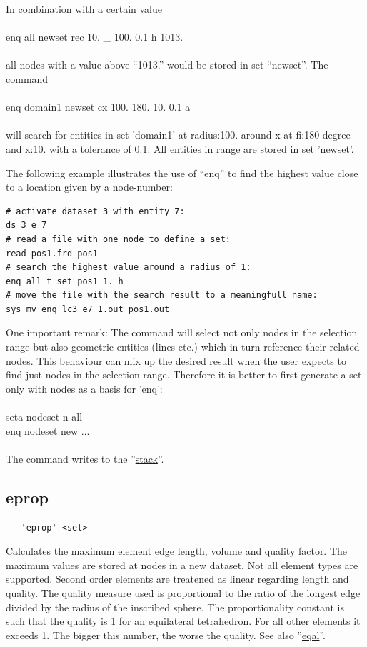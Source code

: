 \documentclass{article}
\providecommand{\htmlref}[2]{\hyperref[#2]{#1}}
\begin{document}
In combination with a certain value\\\\
enq all newset rec 10. \_ 100. 0.1 h 1013.\\\\all nodes with a value above ``1013.'' would be stored in set ``newset''. The command \\\\
enq domain1 newset cx 100. 180. 10. 0.1 a\\\\
will search for entities in set 'domain1' at radius:100. around x at fi:180 degree and x:10. with a tolerance of 0.1. All entities in range are stored in set 'newset'.

The following example illustrates the use of ``enq'' to find the highest value close to a location given by a node-number: 
\begin{verbatim}
# activate dataset 3 with entity 7:
ds 3 e 7
# read a file with one node to define a set:
read pos1.frd pos1
# search the highest value around a radius of 1:
enq all t set pos1 1. h
# move the file with the search result to a meaningfull name:
sys mv enq_lc3_e7_1.out pos1.out
\end{verbatim}

One important remark:
The command will select not only nodes in the selection range but also geometric entities (lines etc.) which in turn reference their related nodes. This behaviour can mix up the desired result when the user expects to find just nodes in the selection range. Therefore it is better to first generate a set only with nodes as a basis for 'enq':\\\\
seta nodeset n all\\
enq nodeset new ...\\\\
The command writes to the ''\htmlref{stack}{stack}''.


\subsection{\label{eprop}eprop}
\begin{verbatim}
   'eprop' <set>
\end{verbatim}
Calculates the maximum element edge length, volume and quality factor. The maximum values are stored at nodes in a new dataset. Not all element types are supported. Second order elements are treatened as linear regarding length and quality. The quality measure used is proportional to the ratio of the longest edge divided by the radius of the inscribed sphere. The proportionality constant is such that the quality is 1 for an equilateral tetrahedron. For all other elements it exceeds 1. The bigger this number, the worse the quality. See also ''\htmlref{eqal}{eqal}''.
\end{document}
